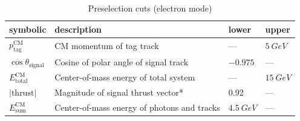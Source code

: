 \documentclass[12pt]{thesis}  %
\begin{document}
\begin{table}[h]
\centering
\begin{tabular}{llll}
\textbf{symbolic} & \textbf{description} & \textbf{lower} & \textbf{upper} \\ \hline
$p_{\text{tag}}^{\text{CM}}$  & CM momentum of tag track & --- & $\SI{5}{GeV}$ \\
$\cos\theta_{\text{signal}}$ & Cosine of polar angle of signal track & $-0.975$ & --- \\
$E_{\text{total}}^{\text{CM}}$ & Center-of-mass energy of total system  & --- & $\SI{15}{GeV}$ \\
$\lvert\text{thrust}\rvert$ & Magnitude of signal thrust vector* & 0.92 & --- \\
$E_{\text{sum}}^{\text{CM}}$ & Center-of-mass energy of photons and tracks & $\SI{4.5}{GeV}$ & ---
\end{tabular}
\caption{Preselection cuts (electron mode)}
\label{my-label}
\end{table}
\end{document}
